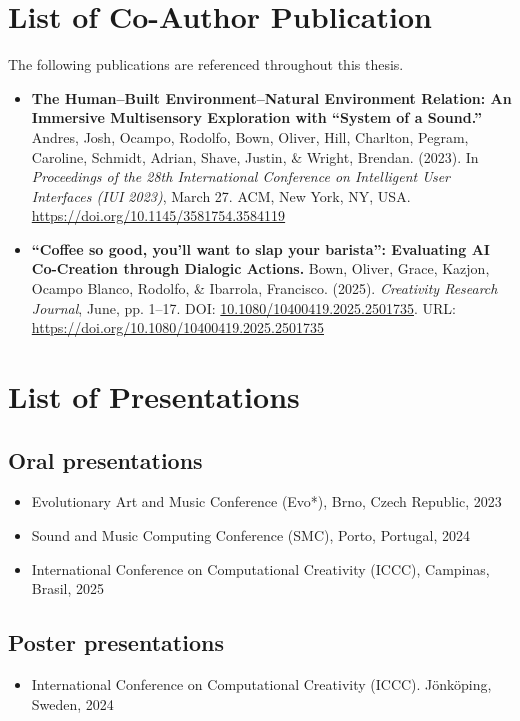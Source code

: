 \section*{List of Co-Author Publication}

The following publications are referenced throughout this thesis. 

\begin{itemize}

\item \textbf{The Human–Built Environment–Natural Environment Relation: An Immersive Multisensory Exploration with “System of a Sound.”} Andres, Josh, Ocampo, Rodolfo, Bown, Oliver, Hill, Charlton, Pegram, Caroline, Schmidt, Adrian, Shave, Justin, \& Wright, Brendan. (2023). In \textit{Proceedings of the 28th International Conference on Intelligent User Interfaces (IUI 2023)}, March 27. ACM, New York, NY, USA. \url{https://doi.org/10.1145/3581754.3584119}


\item \textbf{“Coffee so good, you’ll want to slap your barista”: Evaluating AI Co-Creation through Dialogic Actions.} Bown, Oliver, Grace, Kazjon, Ocampo Blanco, Rodolfo, \& Ibarrola, Francisco. (2025). \textit{Creativity Research Journal}, June, pp. 1–17. DOI: \href{https://doi.org/10.1080/10400419.2025.2501735}{10.1080/10400419.2025.2501735}. URL: \url{https://doi.org/10.1080/10400419.2025.2501735}


\end{itemize}

\section*{List of Presentations}

\subsection*{Oral presentations} 

\begin{itemize}
\item Evolutionary Art and Music Conference (Evo*), Brno, Czech Republic, 2023
\item Sound and Music Computing Conference (SMC), Porto, Portugal, 2024
\item  International Conference on Computational Creativity (ICCC), Campinas, Brasil, 2025
\end{itemize}

\subsection*{Poster presentations}
\begin{itemize}
    \item International Conference on Computational Creativity (ICCC). Jönköping, Sweden, 2024
\end{itemize}

